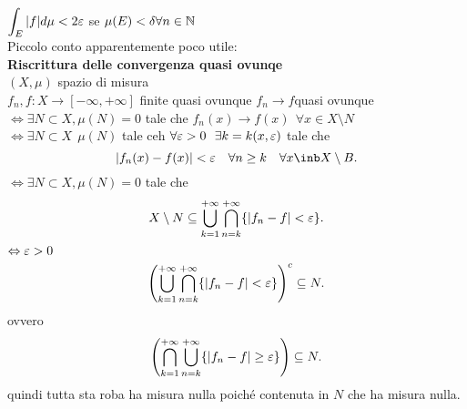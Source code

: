 \documentclass[12px]{article}
\begin{document}
		   $\displaystyle\int_E |f|d\mu < 2\varepsilon$ se  $\mu(E) < \delta \forall n\in \mathbb{N}$\\[10px]
		   Piccolo conto apparentemente poco utile:\\
		   \textbf{Riscrittura delle convergenza quasi ovunqe}\\
		   $(X,\mu)$ spazio di misura\\
		   $f_n,f: X \rightarrow [-\infty , + \infty]$ finite  quasi ovunque $f_n \rightarrow f $quasi ovunque\\
		   $ \Leftrightarrow \exists N\subset X, \mu(N) = 0 $ tale che $f_n(x) \rightarrow f(x)\ \ \forall x\in X\setminus N$\\
		   $ \Leftrightarrow \exists N\subset X\ \ \mu(N)$ tale ceh $\forall \varepsilon > 0 \ \ \exists k = k(x,\varepsilon)$ tale che 
		    \[
		   |f_n(x) - f(x)| < \e \ \ \ \forall n\geq k \ \ \ \forall x\inb X\setminus B
		   .\] 
		   $ \Leftrightarrow \exists N\subset X, \mu(N) = 0$ tale che 
		   \[
			   X\setminus N\subseteq \bigcup^{+\infty}_{k = 1} \bigcap^{+\infty}_{n = k}\{|f_n-f| < \varepsilon\} 
		   .\] 
		   $ \Leftrightarrow \varepsilon > 0 $
		   \[
			   \left( \bigcup^{+\infty}_{k= 1} \bigcap^{+\infty}_{n = k }\{|f_n-f| < \varepsilon\} \right)^c\subseteq N
		   .\] 
		   ovvero
		   \[
			   \left( \bigcap^{+\infty}_{k= 1} \bigcup^{+\infty}_{n = k }\{|f_n-f| \geq \varepsilon\} \right)\subseteq N
		   .\] 
		   quindi tutta sta roba ha misura nulla poiché contenuta in $N$ che ha misura nulla.\\

		 

	
\end{document}
